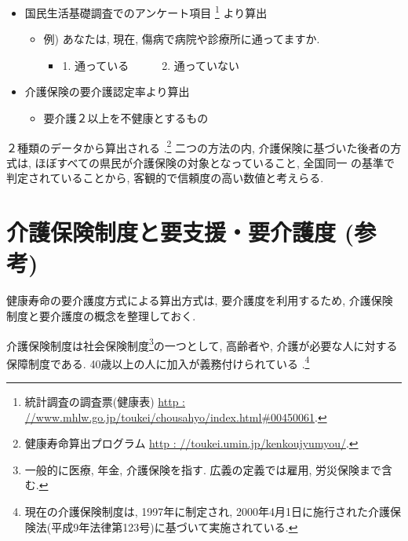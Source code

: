 \begin{itemize} \setlength{\itemsep}{-0.5mm} \setlength{\parskip}{-0.5mm}
	\item 国民生活基礎調査での{アンケート項目}
\footnote{
		      統計調査の調査票(健康表)
		      \url{http : //www.mhlw.go.jp/toukei/chousahyo/index.html#00450061}.
	      }
	      より算出
	      \begin{itemize} \setlength{\itemsep}{-0.5mm} \setlength{\parskip}{-0.5mm}
		      \item 例) あなたは, 現在, 傷病で病院や診療所に通ってますか.
		            \begin{itemize} \setlength{\itemsep}{-0.5mm} \setlength{\parskip}{-0.5mm}
			            \item[] 1. 通っている~~~~~~2. 通っていない
		            \end{itemize}
	      \end{itemize}

	\item 介護保険の要介護認定率より算出
	      \begin{itemize} \setlength{\itemsep}{-0.5mm} \setlength{\parskip}{-0.5mm}
		      \item 要介護２以上を不健康とするもの
	      \end{itemize}
\end{itemize}
２種類のデータから{算出される}
.\footnote{
	健康寿命算出プログラム
	\url{http : //toukei.umin.jp/kenkoujyumyou/}.
}
二つの方法の内, 介護保険に基づいた後者の方式は,
ほぼすべての県民が介護保険の対象となっていること, 全国同一
の基準で判定されていることから, 客観的で信頼度の高い数値と考えらる.




\section{介護保険制度と要支援・要介護度 (参考)}
健康寿命の要介護度方式による算出方式は, 要介護度を利用するため, 介護保険制度と要介護度の概念を整理しておく.

介護保険制度は{社会保険制度}\footnote{一般的に医療, 年金, 介護保険を指す. 広義の定義では雇用, 労災保険まで含む.
}の一つとして,
高齢者や, 介護が必要な人に対する保障制度である.
40歳以上の人に加入が{義務付けられている}
.\footnote{
	現在の介護保険制度は, 1997年に制定され, 2000年4月1日に施行された介護保険法(平成9年法律第123号)に基づいて実施されている.
}


